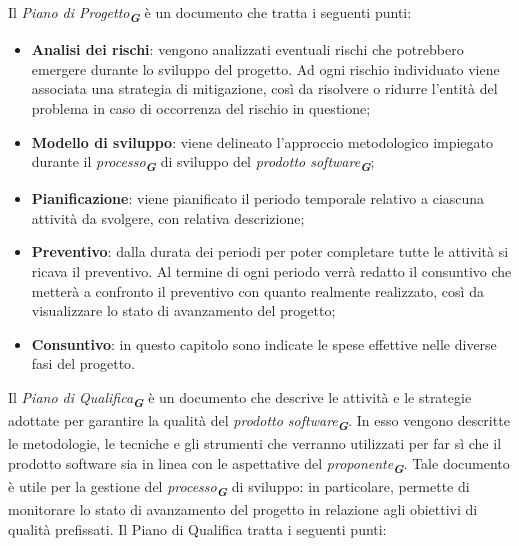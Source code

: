 \begin{enumerate}
Il \emph{Piano di Progetto}\textsubscript{\textit{\textbf{G}}} è un documento che tratta i seguenti punti:
\begin{itemize}
    \item \textbf{Analisi dei rischi}: vengono analizzati eventuali rischi che potrebbero emergere durante lo sviluppo del progetto. 
    Ad ogni rischio individuato viene associata una strategia di mitigazione, così da risolvere o ridurre l’entità del problema 
    in caso di occorrenza del rischio in questione;
    \item \textbf{Modello di sviluppo}: viene delineato l’approccio metodologico impiegato durante il
    \emph{processo}\textsubscript{\textit{\textbf{G}}} di sviluppo del \emph{prodotto software}\textsubscript{\textit{\textbf{G}}};
    \item \textbf{Pianificazione}: viene pianificato il periodo temporale relativo a ciascuna attività da svolgere, con relativa descrizione;
    \item \textbf{Preventivo}: dalla durata dei periodi per poter completare tutte le attività si ricava il preventivo. 
    Al termine di ogni periodo verrà redatto il consuntivo che metterà a confronto il preventivo con quanto realmente realizzato, 
    così da visualizzare lo stato di avanzamento del progetto;
    \item \textbf{Consuntivo}: in questo capitolo sono indicate le spese effettive nelle diverse fasi del progetto.
\end{itemize}

Il \emph{Piano di Qualifica}\textsubscript{\textit{\textbf{G}}} è un documento che descrive le attività e le strategie adottate per
garantire la qualità del \emph{prodotto software}\textsubscript{\textit{\textbf{G}}}. In esso vengono descritte le metodologie, le
tecniche e gli strumenti che verranno utilizzati per far sì che il prodotto software sia in linea
con le aspettative del \emph{proponente}\textsubscript{\textit{\textbf{G}}}. Tale documento è utile per la gestione del \emph{processo}\textsubscript{\textit{\textbf{G}}}
di sviluppo: in particolare, permette di monitorare lo stato di avanzamento del progetto in relazione agli obiettivi di qualità prefissati.
Il Piano di Qualifica tratta i seguenti punti:


\end{enumerate}
